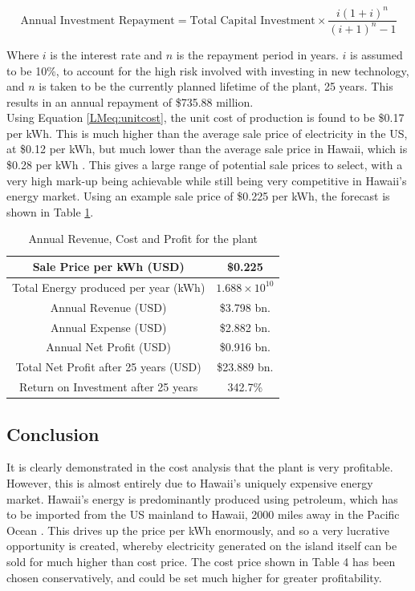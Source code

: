 \documentclass{article}
\begin{document}
\begin{equation}
    \text{Annual Investment Repayment} = \text{Total Capital Investment}\times\frac{i(1+i)^{n}}{(i+1)^{n} - 1}
    \label{LMeq:repayment}
\end{equation}

Where $i$ is the interest rate and $n$ is the repayment period in years. $i$ is assumed to be 10\%, to account for the high risk involved with investing in new technology, and $n$ is taken to be the currently planned lifetime of the plant, 25 years. This results in an annual repayment of \$735.88 million.
\\

Using Equation \ref{LMeq:unitcost}, the unit cost of production is found to be \$0.17 per kWh. This is much higher than the average sale price of electricity in the US, at \$0.12 per kWh, but much lower than the average sale price in Hawaii, which is \$0.28 per kWh \cite{EIAdata}. This gives a large range of potential sale prices to select, with a very high mark-up being achievable while still being very competitive in Hawaii's energy market. Using an example sale price of \$0.225 per kWh, the forecast is shown in Table \ref{LMtable:profit}.

\begin{table}[h]
\centering
\caption{Annual Revenue, Cost and Profit for the plant}
\label{LMtable:profit}
\begin{tabular}{|c|c|}
\hline
Sale Price per kWh (USD)              & \$0.225     \\ \hline
Total Energy produced per year (kWh)  & $\text{1.688} \times \text{10}^{\text{10}}$ \\ \hline
Annual Revenue (USD)                  & \$3.798 bn. \\ \hline
Annual Expense (USD)                  & \$2.882 bn. \\ \hline
Annual Net Profit (USD)               & \$0.916 bn.\\ \hline
Total Net Profit after 25 years (USD) & \$23.889 bn.\\ \hline
Return on Investment after 25 years   & 342.7\%    \\ \hline
\end{tabular}
\end{table}

\subsection{Conclusion}
It is clearly demonstrated in the cost analysis that the plant is very profitable. However, this is almost entirely due to Hawaii's uniquely expensive energy market. Hawaii's energy is predominantly produced using petroleum, which has to be imported from the US mainland to Hawaii, 2000 miles away in the Pacific Ocean \cite{Solar}. This drives up the price per kWh enormously, and so a very lucrative opportunity is created, whereby electricity generated on the island itself can be sold for much higher than cost price. The cost price shown in Table 4 has been chosen conservatively, and could be set much higher for greater profitability.
\\
\end{document}
